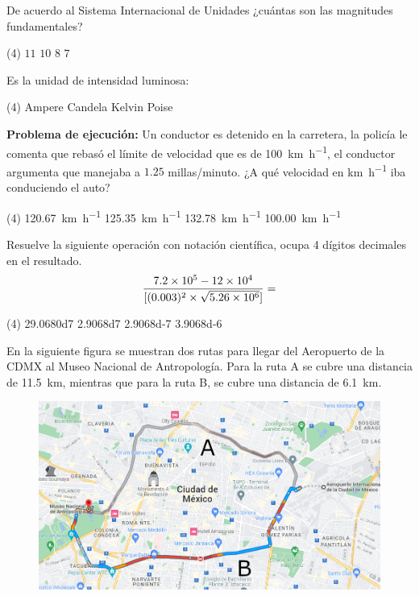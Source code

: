 \documentclass[12pt, letter]{exam}
\begin{document}


\newpage
\begin{questions}
     \question De acuerdo al Sistema Internacional de Unidades ¿cuántas son las magnitudes fundamentales?
     \begin{tasks}(4)
         \task $11$
         \task $10$
         \task $8$
         \task $7$
     \end{tasks}
     \question Es la unidad de intensidad luminosa:
     \begin{tasks}(4)
        \task Ampere
        \task Candela
        \task Kelvin
        \task Poise
    \end{tasks}
    \question \textbf{Problema de ejecución:} Un conductor es detenido en la carretera, la policía le comenta que rebasó el límite de velocidad que es de \SI{100}{\kilo\meter\per\hour}, el conductor argumenta que manejaba a $1.25$ millas/minuto. ¿A qué velocidad en \unit{\kilo\meter\per\hour} iba conduciendo el auto?
    \begin{tasks}(4)
        \task \SI{120.67}{\kilo\meter\per\hour}
        \task \SI{125.35}{\kilo\meter\per\hour}
        \task \SI{132.78}{\kilo\meter\per\hour}
        \task \SI{100.00}{\kilo\meter\per\hour}
    \end{tasks}
    \question Resuelve la siguiente operación con notación científica, ocupa 4 dígitos decimales en el resultado.
    \begin{align*}
    \dfrac{\num{7.2d5} - \num{12e4}}{[(0.003)^{2}  \times \sqrt{\num{5.26d6}}]} =
    \end{align*}
    \begin{tasks}(4)
        \task \num{29.0680d7}
        \task \num{2.9068d7}
        \task \num{2.9068d-7}
        \task \num{3.9068d-6}
    \end{tasks}
    \question En la siguiente figura se muestran dos rutas para llegar del Aeropuerto de la CDMX al Museo Nacional de Antropología. Para la ruta A se cubre una distancia de \SI{11.5}{\kilo\meter}, mientras que para la ruta B, se cubre una distancia de \SI{6.1}{\kilo\meter}.
    \begin{figure}[H]
        \centering
        \includegraphics[scale=0.5]{Imagenes/Trayectoria_03.png}

\end{figure}
\end{questions}
\end{document}
